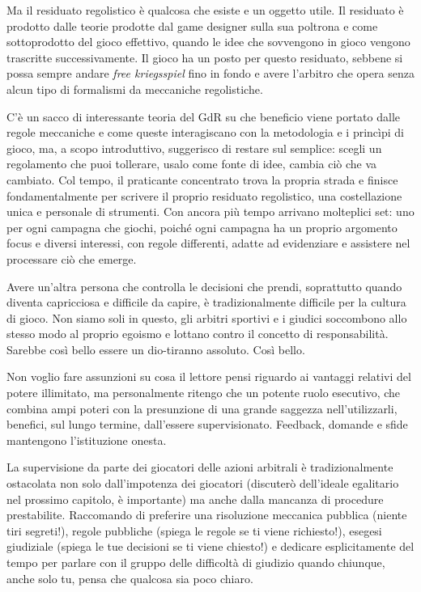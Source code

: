 Ma il residuato regolistico è qualcosa che esiste e un oggetto utile. Il residuato è prodotto dalle teorie prodotte dal game designer sulla sua poltrona e come sottoprodotto del gioco effettivo, quando le idee che sovvengono in gioco vengono trascritte successivamente. Il gioco ha un posto per questo residuato, sebbene si possa sempre andare \textit{free kriegsspiel} fino in fondo e avere l'arbitro che opera senza alcun tipo di formalismi da meccaniche regolistiche.

C'è un sacco di interessante teoria del GdR su che beneficio viene portato dalle regole meccaniche e come queste interagiscano con la metodologia e i princìpi di gioco, ma, a scopo introduttivo, suggerisco di restare sul semplice: scegli un regolamento che puoi tollerare, usalo come fonte di idee, cambia ciò che va cambiato. Col tempo, il praticante concentrato trova la propria strada e finisce fondamentalmente per scrivere il proprio residuato regolistico, una costellazione unica e personale di strumenti. Con ancora più tempo arrivano molteplici set: uno per ogni campagna che giochi, poiché ogni campagna ha un proprio argomento focus e diversi interessi, con regole differenti, adatte ad evidenziare e assistere nel processare ciò che emerge.




Avere un'altra persona che controlla le decisioni che prendi, soprattutto quando diventa capricciosa e difficile da capire, è tradizionalmente difficile per la cultura di gioco. Non siamo soli in questo, gli arbitri sportivi e i giudici soccombono allo stesso modo al proprio egoismo e lottano contro il concetto di responsabilità. Sarebbe così bello essere un dio-tiranno assoluto. Così bello.

Non voglio fare assunzioni su cosa il lettore pensi riguardo ai vantaggi relativi del potere illimitato, ma personalmente ritengo che un potente ruolo esecutivo, che combina ampi poteri con la presunzione di una grande saggezza nell'utilizzarli, benefici, sul lungo termine, dall'essere supervisionato. Feedback, domande e sfide mantengono l'istituzione onesta.

La supervisione da parte dei giocatori delle azioni arbitrali è tradizionalmente ostacolata non solo dall'impotenza dei giocatori (discuterò dell'ideale egalitario nel prossimo capitolo, è importante) ma anche dalla mancanza di procedure prestabilite. Raccomando di preferire una risoluzione meccanica pubblica (niente tiri segreti!), regole pubbliche (spiega le regole se ti viene richiesto!), esegesi giudiziale (spiega le tue decisioni se ti viene chiesto!) e dedicare esplicitamente del tempo per parlare con il gruppo delle difficoltà di giudizio quando chiunque, anche solo tu, pensa che qualcosa sia poco chiaro.


